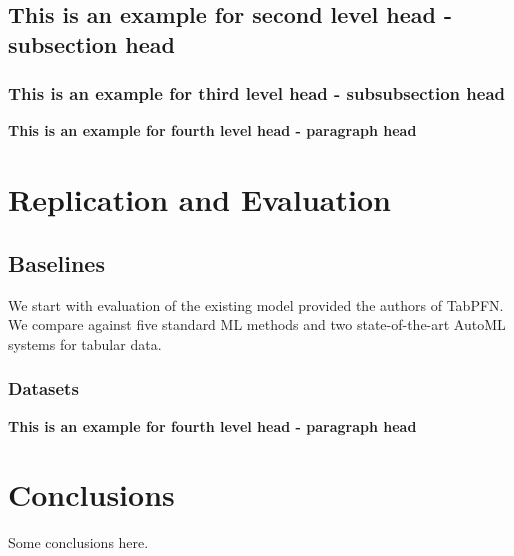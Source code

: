 \documentclass[a4paper]{article}
\newcommand{\subsubsubsection}[1]{%
  \vspace{\baselineskip}%
  \noindent\textbf{#1\\}\quad%
}
\begin{document}
\subsection{This is an example for second level head - subsection head}\label{subsec1}
\lipsum[5]

\subsubsection{This is an example for third level head - subsubsection head}\label{subsubsec1}
\lipsum[6]

\subsubsubsection{This is an example for fourth level head - paragraph head}
\lipsum[7]


\section{Replication and Evaluation}\label{sec3}

\subsection{Baselines}\label{subsec2}

We start with evaluation of the existing model provided the authors of TabPFN.  We compare against five standard ML methods and two state-of-the-art AutoML systems for tabular data.

\subsubsection{Datasets}\label{subsubsec2}
\lipsum[8]

\subsubsubsection{This is an example for fourth level head - paragraph head}
\lipsum[9]


\section{Conclusions}
Some conclusions here.


\printbibliography




\end{document}
